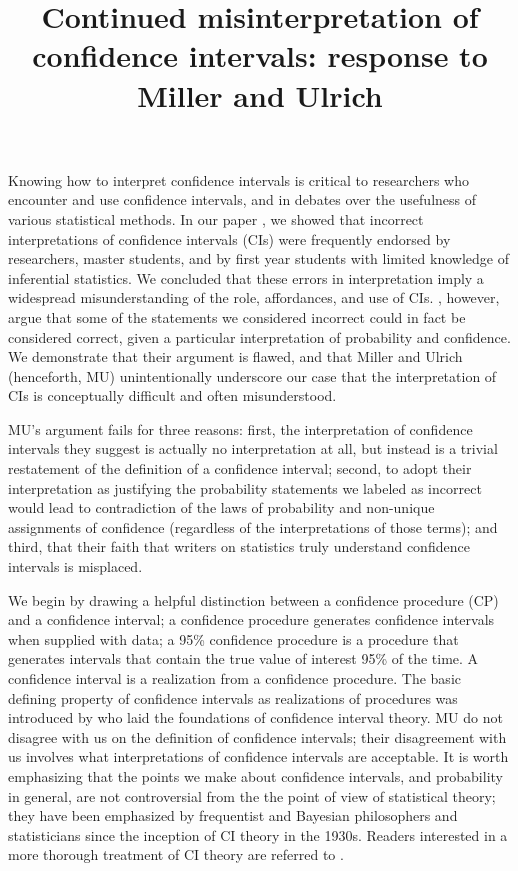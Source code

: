 \documentclass[jou,a4paper,floatsintext,draftfirst]{apa6}\usepackage[]{graphicx}\usepackage[]{color}
\title{Continued misinterpretation of confidence intervals: response to Miller and Ulrich}
\begin{document}
\maketitle




Knowing how to interpret confidence intervals is critical to researchers who encounter and use confidence intervals, and in debates over the usefulness of various statistical methods. In our paper \citep{Hoekstra:etal:2014}, we showed that incorrect interpretations of confidence intervals (CIs) were frequently endorsed by researchers, master students, and by first year students with limited knowledge of inferential statistics. We concluded that these errors in interpretation imply a widespread misunderstanding of the role, affordances, and use of CIs. \citet{Miller:Ulrich:inpress}, however, argue that some of the statements we considered incorrect could in fact be considered correct, given a particular interpretation of probability and confidence. We demonstrate that their argument is flawed, and that Miller and Ulrich (henceforth, MU) unintentionally underscore our case that the interpretation of CIs is conceptually difficult and often misunderstood.

MU's argument fails for three reasons: first, the interpretation of confidence intervals they suggest is actually no interpretation at all, but instead is a trivial restatement of the definition of a confidence interval; second, to adopt their interpretation as justifying the probability statements we labeled as incorrect would lead to contradiction of the laws of probability and non-unique assignments of confidence (regardless of the interpretations of those terms); and third, that their faith that writers on statistics truly understand confidence intervals is misplaced.
	
We begin by drawing a helpful distinction between a confidence procedure (CP) and a confidence interval; a confidence procedure generates confidence intervals when supplied with data; a 95\% confidence procedure is a procedure that generates intervals that contain the true value of interest 95\% of the time. A confidence interval is a realization from a confidence procedure. The basic defining property of confidence intervals as realizations of procedures was introduced by \citet{Neyman:1934,Neyman:1937} who laid the foundations of confidence interval theory. MU do not disagree with us on the definition of confidence intervals; their disagreement with us involves what interpretations of confidence intervals are acceptable. It is worth emphasizing that the points we make about confidence intervals, and probability in general, are not controversial from the the point of view of statistical theory; they have been emphasized by frequentist and Bayesian philosophers and statisticians since the inception of CI theory in the 1930s. Readers interested in a more thorough treatment of CI theory are referred to \citet{Morey:etal:unpublished}.
\end{document}
